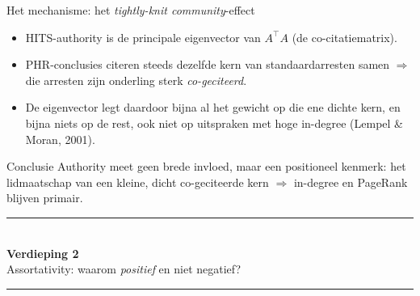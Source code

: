\documentclass[aspectratio=169,11pt]{beamer}
\newcommand{\rd}[1]{\textcolor{uvared}{#1}}
\begin{document}
\begin{frame}{Het mechanisme: het \emph{tightly-knit community}-effect}
  \begin{itemize}
    \item HITS-authority is de \rd{principale eigenvector van $A^{\!\top}A$} (de co-citatiematrix).
    \item PHR-conclusies citeren steeds \rd{dezelfde kern} van standaardarresten samen $\Rightarrow$ die arresten zijn onderling sterk \emph{co-geciteerd}.
    \item De eigenvector legt daardoor bijna al het gewicht op die ene dichte kern, en \rd{bijna niets} op de rest, ook niet op uitspraken met hoge in-degree (Lempel \& Moran, 2001).
  \end{itemize}
  \vspace{0.3em}
  \begin{block}{Conclusie}
    Authority meet \rd{geen brede invloed}, maar een \rd{positioneel kenmerk}: het lidmaatschap van een kleine, dicht co-geciteerde kern $\Rightarrow$ in-degree en PageRank blijven primair.
  \end{block}
\end{frame}


\begin{frame}[plain]
  \centering
  \vspace{1.4cm}
  {\color{uvared}\rule{0.5\textwidth}{1.2pt}}\\[0.7em]
  {\Large\bfseries Verdieping 2}\\[0.4em]
  {\large Assortativity: waarom \emph{positief} en niet negatief?}\\[0.7em]
  {\color{uvared}\rule{0.5\textwidth}{1.2pt}}
\end{frame}
\end{document}
